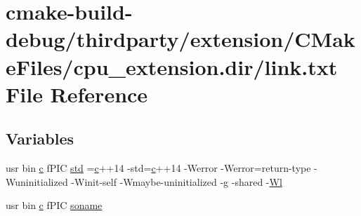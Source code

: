 \hypertarget{thirdparty_2extension_2CMakeFiles_2cpu__extension_8dir_2link_8txt}{}\section{cmake-\/build-\/debug/thirdparty/extension/\+C\+Make\+Files/cpu\+\_\+extension.dir/link.txt File Reference}
\label{thirdparty_2extension_2CMakeFiles_2cpu__extension_8dir_2link_8txt}
\subsection*{Variables}
\begin{DoxyCompactItemize}
\item 
usr bin \hyperlink{CMakeCache_8txt_aac1d6a1710812201527c735f7c6afbaa}{c} f\+P\+IC \hyperlink{thirdparty_2extension_2CMakeFiles_2cpu__extension_8dir_2link_8txt_a5f87c8f8e33670f7c8c5221b6be1bcc4}{std} =\hyperlink{CMakeCache_8txt_aac1d6a1710812201527c735f7c6afbaa}{c}++14 -\/std=\hyperlink{CMakeCache_8txt_aac1d6a1710812201527c735f7c6afbaa}{c}++14 -\/Werror -\/Werror=return-\/type -\/Wuninitialized -\/Winit-\/self -\/Wmaybe-\/uninitialized -\/g -\/shared -\/\hyperlink{thirdparty_2extension_2CMakeFiles_2cpu__extension_8dir_2link_8txt_af9ccbf658ed2deb89d0d79f211e5b033}{Wl}
\item 
usr bin \hyperlink{CMakeCache_8txt_aac1d6a1710812201527c735f7c6afbaa}{c} f\+P\+IC \hyperlink{thirdparty_2extension_2CMakeFiles_2cpu__extension_8dir_2link_8txt_ab65a9b6457c4853ed17f89f945516e66}{soname}
\item 

\end{DoxyCompactItemize}
